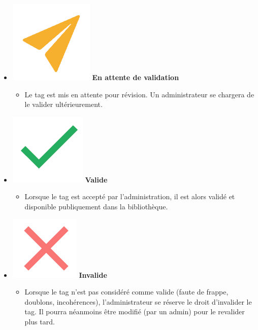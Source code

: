 \begin{itemize}
    \item \includegraphics[valign=b,height=1.4\fontcharht\font`X]{images/client/pending.png} \textbf{En attente de validation}
    \begin{itemize}
        \item Le \gls{tag} est mis en attente pour révision. Un administrateur se chargera de le valider ultérieurement.
    \end{itemize}
    \item \includegraphics[valign=b,height=1.4\fontcharht\font`X]{images/client/validated.png} \textbf{Valide}
    \begin{itemize}
        \item Lorsque le \gls{tag} est accepté par l'administration, il est alors validé et disponible publiquement dans la bibliothèque.
    \end{itemize} 
    \item \includegraphics[valign=b,height=1.4\fontcharht\font`X]{images/client/not-validated.png} \textbf{Invalide}
    \begin{itemize}
        \item Lorsque le \gls{tag} n'est pas considéré comme valide (faute de frappe, doublons, incohérences), l'administrateur se réserve le droit d'invalider le tag. Il pourra néanmoins être modifié (par un admin) pour le revalider plus tard.
    \end{itemize}

\end{itemize}
